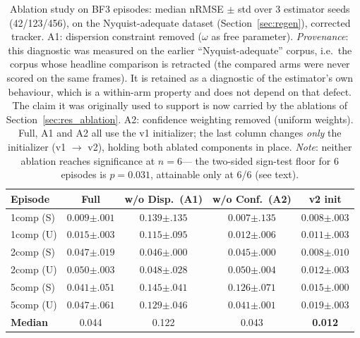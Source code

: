 \begin{table}[t]
\centering
\caption{Ablation study on BF3 episodes: median nRMSE $\pm$ std over
3 estimator seeds (42/123/456), on the Nyquist-adequate dataset
(Section~\ref{sec:regen}), corrected tracker.
A1: dispersion constraint removed ($\omega$ as free parameter).
\emph{Provenance}: this diagnostic was measured on the earlier ``Nyquist-adequate'' corpus, i.e.\ the corpus whose headline comparison is retracted (the compared arms were never scored on the same frames). It is retained as a diagnostic of the estimator's own behaviour, which is a within-arm property and does not depend on that defect. The claim it was originally used to support is now carried by the ablations of Section~\ref{sec:res_ablation}.
A2: confidence weighting removed (uniform weights).
Full, A1 and A2 all use the v1 initializer; the last column changes
\emph{only} the initializer (v1 $\to$ v2), holding both ablated
components in place.
\emph{Note}: neither ablation reaches significance at $n=6$---%
the two-sided sign-test floor for 6 episodes is $p=0.031$, attainable
only at 6/6 (see text).}
\label{tab:ablation}
\begin{tabular}{lcccc}
\toprule
Episode & Full & w/o Disp.\ (A1) & w/o Conf.\ (A2) & v2 init \\
\midrule
1comp (S) & $0.009{\scriptstyle\pm.001}$ & $0.139{\scriptstyle\pm.135}$ & $\mathbf{0.007}{\scriptstyle\pm.135}$ & $0.008{\scriptstyle\pm.003}$ \\
1comp (U) & $0.015{\scriptstyle\pm.003}$ & $0.115{\scriptstyle\pm.095}$ & $0.012{\scriptstyle\pm.006}$ & $\mathbf{0.011}{\scriptstyle\pm.003}$ \\
2comp (S) & $0.047{\scriptstyle\pm.019}$ & $0.046{\scriptstyle\pm.000}$ & $0.045{\scriptstyle\pm.000}$ & $\mathbf{0.008}{\scriptstyle\pm.010}$ \\
2comp (U) & $0.050{\scriptstyle\pm.003}$ & $0.048{\scriptstyle\pm.028}$ & $0.050{\scriptstyle\pm.004}$ & $\mathbf{0.012}{\scriptstyle\pm.003}$ \\
5comp (S) & $0.041{\scriptstyle\pm.051}$ & $0.145{\scriptstyle\pm.041}$ & $0.126{\scriptstyle\pm.071}$ & $\mathbf{0.015}{\scriptstyle\pm.000}$ \\
5comp (U) & $0.047{\scriptstyle\pm.061}$ & $0.129{\scriptstyle\pm.046}$ & $0.041{\scriptstyle\pm.001}$ & $\mathbf{0.019}{\scriptstyle\pm.003}$ \\
\midrule
\textbf{Median} & 0.044 & 0.122 & 0.043 & \textbf{0.012} \\
\bottomrule
\end{tabular}
\end{table}

